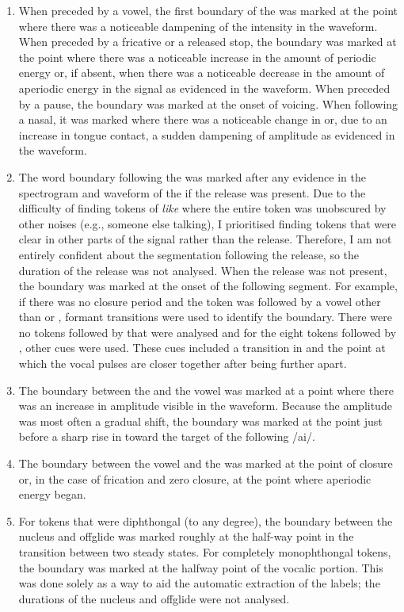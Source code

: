 \begin{enumerate}
	\item When preceded by a vowel, the first boundary of the  was marked at the point where there was a noticeable dampening of the intensity in the waveform. When preceded by a fricative or a released stop, the boundary was marked at the point where there was a noticeable increase in the amount of periodic energy or, if absent, when there was a noticeable decrease in the amount of aperiodic energy in the signal as evidenced in the waveform. When preceded by a pause, the boundary was marked at the onset of voicing. When following a nasal, it was marked where there was a noticeable change in  or, due to an increase in tongue contact, a sudden dampening of amplitude as evidenced in the waveform.
\largerpage
	\item The word boundary following the  was marked after any evidence in the spectrogram and waveform of the  if the release was present. Due to the difficulty of finding tokens of \textit{like} where the entire token was unobscured by other noises (e.g., someone else talking), I prioritised finding tokens that were clear in other parts of the signal rather than the release. Therefore, I am not entirely confident about the segmentation following the release, so the duration of the release was not analysed. When the release was not present, the boundary was marked at the onset of the following segment. For example, if there was no closure period and the token was followed by a vowel other than  or , formant transitions were used to identify the boundary. There were no tokens followed by  that were analysed and for the eight tokens followed by , other cues were used. These cues included a transition in  and the point at which the vocal pulses are closer together after being further apart.
	\item The boundary between the  and the vowel was marked at a point where there was an increase in amplitude visible in the waveform. Because the amplitude was most often a gradual shift, the boundary was marked at the point just before a sharp rise in  toward the target of the following /ai/.
	\item The boundary between the vowel and the  was marked at the point of closure or, in the case of frication and zero closure, at the point where aperiodic energy began.
	\item For tokens that were diphthongal (to any degree), the boundary between the nucleus and offglide was marked roughly at the half-way point in the transition between two steady states. For completely monophthongal tokens, the boundary was marked at the halfway point of the vocalic portion. This was done solely as a way to aid the automatic extraction of the labels; the durations of the nucleus and offglide were not analysed.
	
\end{enumerate}

